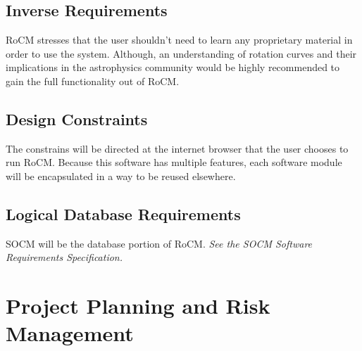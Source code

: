 \documentclass[titlepage]{article}
\begin{document}
\subsection{Inverse Requirements}
RoCM stresses that the user shouldn't need to learn any proprietary material in order to use the system. Although, an understanding of rotation curves and their implications in the astrophysics community would be highly recommended to gain the full functionality out of RoCM.

\subsection{Design Constraints}
The constrains will be directed at the internet browser that the user chooses to run RoCM. Because this software has multiple features, each software module will be encapsulated in a way to be reused elsewhere.

\subsection{Logical Database Requirements}
SOCM will be the database portion of RoCM. \textit{See the SOCM Software Requirements Specification.}

\section{Project Planning and Risk Management}


\def \Ta {\shortstack{GUI \\ Redesign}}
\def \TaAlt {GUI Redesign}

\def \Tb {\shortstack{Modularize \\ Code}}
\def \TbAlt {Modularize Code}

\def \Tc {\shortstack{RoCS \\ Integration}}
\def \TcAlt {RoCS Integration}

\def \Td {\shortstack{SOCM \\ Integration}}
\def \TdAlt {SOCM Integration}

\def \Te {\shortstack{Model \\ Development}}
\def \TeAlt {Model Development}

\def \Tf {\shortstack{Core Functionality \\ Development}}
\def \TfAlt {Core Functionality Development}
\end{document}
